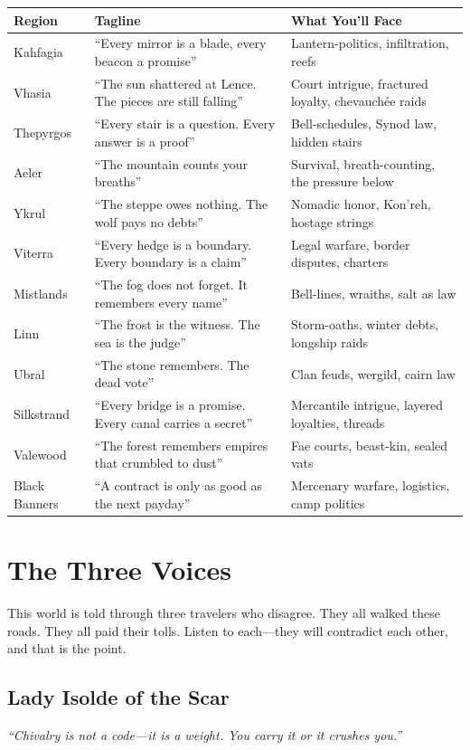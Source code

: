 \documentclass[10pt]{article}
\begin{document}
\begin{tabular}{@{}lll@{}}
\toprule
\textbf{Region} & \textbf{Tagline} & \textbf{What You'll Face} \\
\midrule
Kahfagia & ``Every mirror is a blade, every beacon a promise'' & Lantern-politics, infiltration, reefs \\
Vhasia & ``The sun shattered at Lence. The pieces are still falling'' & Court intrigue, fractured loyalty, chevauchée raids \\
Thepyrgos & ``Every stair is a question. Every answer is a proof'' & Bell-schedules, Synod law, hidden stairs \\
Aeler & ``The mountain counts your breaths'' & Survival, breath-counting, the pressure below \\
Ykrul & ``The steppe owes nothing. The wolf pays no debts'' & Nomadic honor, Kon'reh, hostage strings \\
Viterra & ``Every hedge is a boundary. Every boundary is a claim'' & Legal warfare, border disputes, charters \\
Mistlands & ``The fog does not forget. It remembers every name'' & Bell-lines, wraiths, salt as law \\
Linn & ``The frost is the witness. The sea is the judge'' & Storm-oaths, winter debts, longship raids \\
Ubral & ``The stone remembers. The dead vote'' & Clan feuds, wergild, cairn law \\
Silkstrand & ``Every bridge is a promise. Every canal carries a secret'' & Mercantile intrigue, layered loyalties, threads \\
Valewood & ``The forest remembers empires that crumbled to dust'' & Fae courts, beast-kin, sealed vats \\
Black Banners & ``A contract is only as good as the next payday'' & Mercenary warfare, logistics, camp politics \\
\bottomrule
\end{tabular}

\section*{The Three Voices}

This world is told through three travelers who disagree. They all walked these roads. 
They all paid their tolls. Listen to each---they will contradict each other, and that 
is the point.

\subsection*{Lady Isolde of the Scar}
\emph{``Chivalry is not a code---it is a weight. You carry it or it crushes you.''}
\end{document}
